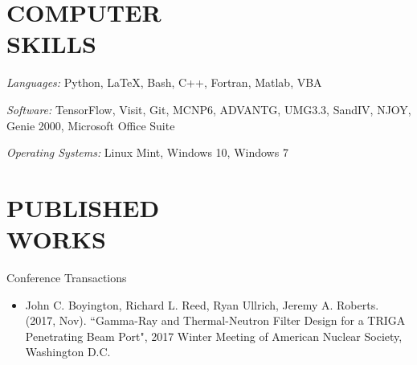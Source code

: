 \documentclass[margin, 10pt]{res} %
\begin{document}
\begin{resume}
\section{COMPUTER \\ SKILLS} 

{\sl Languages:}
Python, \LaTeX, Bash, C++, Fortran, Matlab, VBA

{\sl Software:}
TensorFlow, Visit, Git, MCNP6, ADVANTG, UMG3.3, SandIV, NJOY, Genie 2000, Microsoft Office Suite

{\sl Operating Systems:}
Linux Mint, Windows 10, Windows 7

\section{PUBLISHED \\ WORKS}
Conference Transactions
\begin{itemize}
\item John C. Boyington, Richard L. Reed, Ryan Ullrich, Jeremy A. Roberts. (2017, Nov). ``Gamma-Ray and Thermal-Neutron Filter Design for a TRIGA Penetrating Beam Port", 2017 Winter Meeting of American Nuclear Society, Washington D.C.
\end{itemize}


\end{resume}
\end{document}
